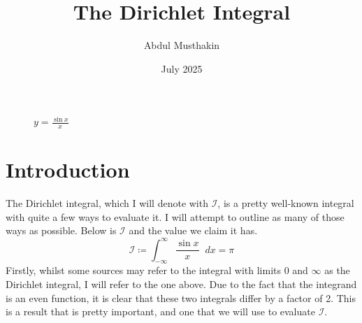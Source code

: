 \documentclass[a4paper]{article}
\title{The Dirichlet Integral}
\author{Abdul Musthakin}
\date{July 2025}
\newcommand*\diff{\mathop{}\!d} %
\theoremstyle{definition}
\begin{document}
\maketitle

\begin{figure}[!h]
    \centering
    \captionsetup{justification=centering}
    \caption{$y = \frac{\sin x}{x}$}
    \label{fig:fig1}
\end{figure}

\pagebreak

\tableofcontents

\section{Introduction}

The Dirichlet integral, which I will denote with $\mathcal{I}$, is a pretty well-known integral with quite a few ways to evaluate it.
I will attempt to outline as many of those ways as possible.
Below is $\mathcal{I}$ and the value we claim it has.
\begin{equation}
    \mathcal{I} \coloneq \int_{-\infty}^{\infty} \frac{\sin x}{x} \diff x = \pi
\end{equation}
Firstly, whilst some sources may refer to the integral with limits 0 and $\infty$ as the Dirichlet integral, I will refer to the one above.
Due to the fact that the integrand is an even function, it is clear that these two integrals differ by a factor of 2.
This is a result that is pretty important, and one that we will use to evaluate $\mathcal{I}$.
\end{document}
